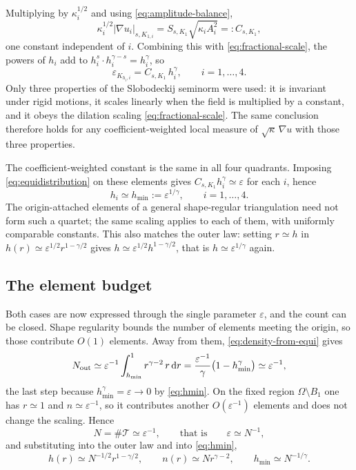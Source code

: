 \documentclass[10pt,pdftex]{amsart}%
\numberwithin{equation}{section}
\newcommand{\dd}{\,\mathrm{d}}
\newcommand{\Tcal}{\mathcal{T}}
\begin{document}
Multiplying by $\kappa_i^{1/2}$ and using \eqref{eq:amplitude-balance},
\[
\kappa_i^{1/2}|\nabla u_i|_{s,K_{1,i}} =S_{s,K_1}\sqrt{\kappa_iA_i^2} =:C_{s,K_1},
\]
one constant independent of $i$.  Combining this with \eqref{eq:fractional-scale}, the powers of $h_i$ add to $h_i^s\cdot h_i^{\gamma-s}=h_i^\gamma$, so
\begin{equation}\label{eq:origin-balance}
 \boxed{
 \varepsilon_{K_{h_i,i}}
 =C_{s,K_1}\,h_i^{\gamma},
 \qquad i=1,\ldots,4.}
\end{equation}
Only three properties of the Slobodeckij seminorm were used: it is invariant under rigid motions, it scales linearly when the field is multiplied by a constant, and it obeys the dilation scaling \eqref{eq:fractional-scale}.  The same conclusion therefore holds for any coefficient-weighted local measure of $\sqrt\kappa\,\nabla u$ with those three properties.

The coefficient-weighted constant is the same in all four quadrants.  Imposing \eqref{eq:equidistribution} on these elements gives $C_{s,K_1}h_i^{\gamma}\simeq\varepsilon$ for each $i$, hence
\begin{equation}\label{eq:hmin}
  \boxed{h_i\simeq h_{\min}:=\varepsilon^{1/\gamma},\qquad i=1,\ldots,4 .}
\end{equation}
The origin-attached elements of a general shape-regular triangulation need not form such a quartet; the same scaling applies to each of them, with uniformly comparable constants.  This also matches the outer law: setting $r\simeq h$ in $h(r)\simeq\varepsilon^{1/2}r^{1-\gamma/2}$ gives $h\simeq\varepsilon^{1/2}h^{1-\gamma/2}$, that is $h\simeq\varepsilon^{1/\gamma}$ again.

\subsection{The element budget}
\label{sec:budget}

Both cases are now expressed through the single parameter $\varepsilon$, and the count can be closed.  Shape regularity bounds the number of elements meeting the origin, so those contribute $O(1)$ elements.  Away from them, \eqref{eq:density-from-equi} gives
\[
  N_{\rm out}\simeq\varepsilon^{-1}\int_{h_{\min}}^{1}r^{\gamma-2}\,r\dd r
  =\frac{\varepsilon^{-1}}{\gamma}\bigl(1-h_{\min}^{\gamma}\bigr)
  \simeq\varepsilon^{-1},
\]
the last step because $h_{\min}^{\gamma}=\varepsilon\to0$ by \eqref{eq:hmin}.  On the fixed region $\Omega\setminus B_1$ one has $r\simeq1$ and $n\simeq\varepsilon^{-1}$, so it contributes another $O(\varepsilon^{-1})$ elements and does not change the scaling.  Hence
\begin{equation}\label{eq:common-error}
  N=\#\Tcal\simeq\varepsilon^{-1},
  \qquad\text{that is}\qquad
  \varepsilon\simeq N^{-1},
\end{equation}
and substituting into the outer law and into \eqref{eq:hmin},
\begin{equation}\label{eq:mesh-law}
 \boxed{
 h(r)\simeq N^{-1/2}r^{1-\gamma/2},
 \qquad
 n(r)\simeq N r^{\gamma-2},
 \qquad
 h_{\min}\simeq N^{-1/\gamma}.}
\end{equation}
\end{document}
